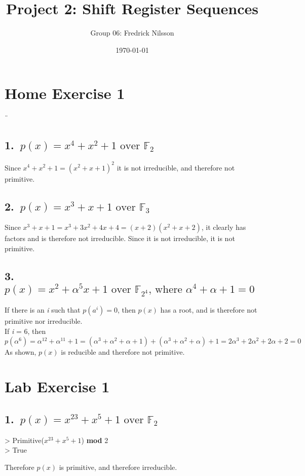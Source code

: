 \documentclass[12pt]{article}
\title{Project 2: Shift Register Sequences}
\author{Group 06: Fredrick Nilsson}
\date{\today}
\newenvironment{Courier}{\fontfamily{pcr}\selectfont}{\par}
\begin{document}
\maketitle

\tableofcontents

\newpage

\section*{Home Exercise 1}¨
\subsection*{1.\ \(p(x) = x^4 + x^2 + 1 \text{ over } \mathbb{F}_2\)}

    Since \(x^4+x^2+1={(x^2+x+1)}^2\) it is not irreducible, and therefore not primitive.

\subsection*{2.\ \(p(x) = x^3 + x + 1 \text{ over } \mathbb{F}_3\)}

    Since \(x^3+x+1=x^3+3x^2+4x+4=(x+2)(x^2+x+2)\), it clearly has factors and is therefore not irreducible. Since it is not irreducible, it is not primitive.

\subsection*{3.\ \(p(x) = x^2 + \alpha^5x + 1 \text{ over } \mathbb{F}_{2^4}\text{, where } \alpha^4 + \alpha + 1 = 0\)}

If there is an \textit{i} such that \(p(a^i) = 0 \), then \(p(x)\) has a root, and is therefore not primitive nor irreducible.
\\
If \textit{i} = 6, then \(p(\alpha^6) = \alpha^{12} + \alpha^{11} + 1 = (\alpha^3 + \alpha^2 + \alpha + 1) + (\alpha^3 + \alpha^2 + \alpha) + 1 = 
2\alpha^3 + 2\alpha^2 + 2\alpha + 2 = 0\)
As shown, \(p(x)\) is reducible and therefore not primitive.
\section*{Lab Exercise 1}
    \subsection*{1.\ \(p(x) = x^{23} + x^5 + 1 \text{ over } \mathbb{F}_2\)}

        \begin{Courier}
        \hspace*{10pt} > Primitive(\(x^{23} + x^5 + 1\)) \textbf{mod} 2
        \\
        \hspace*{10pt} > True
        \end{Courier}
        Therefore \(p(x)\) is primitive, and therefore irreducible.
\end{document}
